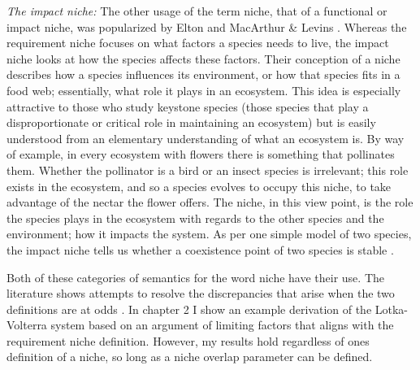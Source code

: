 \emph{The impact niche:}
The other usage of the term niche, that of a functional or impact niche, was popularized by Elton \cite{Elton1927} and MacArthur \& Levins \cite{MacArthur1967}. 
Whereas the requirement niche focuses on what factors a species needs to live, the impact niche looks at how the species affects these factors. 
Their conception of a niche describes how a species influences its environment, or how that species fits in a food web; essentially, what role it plays in an ecosystem. 
This idea is especially attractive to those who study keystone species (those species that play a disproportionate or critical role in maintaining an ecosystem) \cite{May1999,Chesson2000,Leibold2006} but is easily understood from an elementary understanding of what an ecosystem is. 
By way of example, in every ecosystem with flowers there is something that pollinates them. 
Whether the pollinator is a bird or an insect species is irrelevant; this role exists in the ecosystem, and so a species evolves to occupy this niche, to take advantage of the nectar the flower offers. 
The niche, in this view point, is the role the species plays in the ecosystem with regards to the other species and the environment; how it impacts the system. 
As per one simple model of two species, the impact niche tells us whether a coexistence point of two species is stable \cite{Tilman1982textbook}. 

Both of these categories of semantics for the word niche have their use.
The literature shows attempts to resolve the discrepancies that arise when the two definitions are at odds \cite{Leibold1995,Leibold2006}. 
In chapter 2 I show an example derivation of the Lotka-Volterra system based on an argument of limiting factors that aligns with the requirement niche definition. 
However, my results hold regardless of ones definition of a niche, so long as a niche overlap parameter can be defined. 


